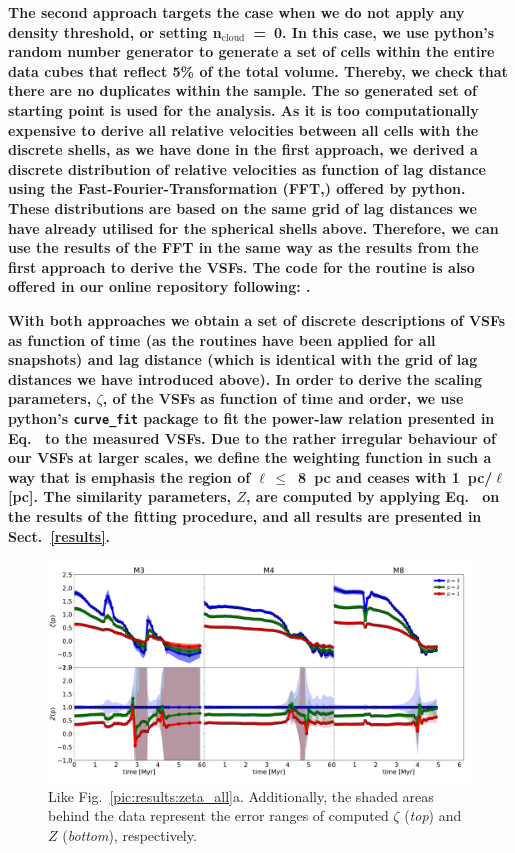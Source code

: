 \textbf{
    The second approach targets the case when we do not apply any density threshold, or setting n$_\mathrm{cloud}$~=~0.
    In this case, we use python's random number generator  to generate a set of cells within the entire data cubes that reflect 5\% of the total volume. 
    Thereby, we check that there are no duplicates within the sample.
    The so generated set of starting point is used for the analysis.
    As it is too computationally expensive to derive all relative velocities between all cells with the discrete shells, as we have done in the first approach, we derived a discrete distribution of relative velocities as function of lag distance using the Fast-Fourier-Transformation (FFT,) offered by python.
    These distributions are based on the same grid of lag distances we have already utilised for the spherical shells above.
    Therefore, we can use the results of the FFT in the same way as the results from the first approach to derive the VSFs.
    The code for the routine is also offered in our online repository following: .
}

\textbf{
    With both approaches we obtain a set of discrete descriptions of VSFs as function of time (as the routines have been applied for all snapshots) and lag distance (which is identical with the grid of lag distances we have introduced above).
    In order to derive the scaling parameters, $\zeta$, of the VSFs as function of time and order, we use python's \texttt{curve\_fit} package to fit the power-law relation presented in Eq.~ to the measured VSFs.
    Due to the rather irregular behaviour of our VSFs at larger scales, we define the weighting function in such a way that is emphasis the region of $\ell\,\leq$~8~pc and ceases with 1~pc/$\ell$[pc]. 
    The similarity parameters, $Z$, are computed by applying Eq.~ on the results of the fitting procedure, and all results are presented in Sect.~\ref{results}.
}

\begin{figure}
    \centering
    \includegraphics[width=\textwidth]{error_vsf04_zeta_z.pdf}
    \caption{
        Like Fig.~\ref{pic:results:zeta_all}a.
        Additionally, the shaded areas behind the data represent the error ranges of computed $\zeta$ (\textit{top}) and $Z$ (\textit{bottom}), respectively. 
    }
    \label{pic:appFitting:error_vsfhr04_zeta_z}
\end{figure}

